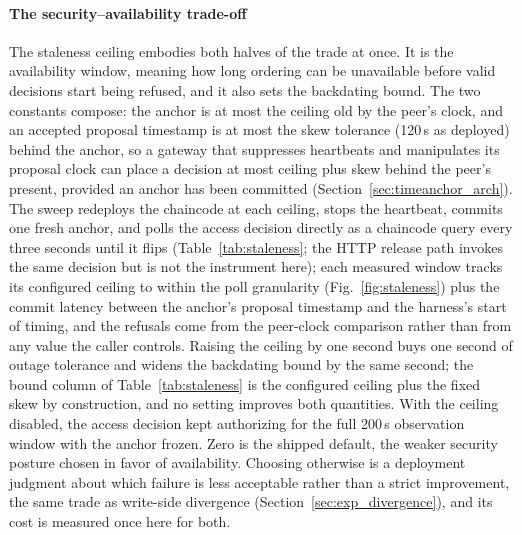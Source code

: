 \documentclass[preprint,12pt]{elsarticle}
\begin{document}
\paragraph{The security--availability trade-off}
The staleness ceiling embodies both halves of the trade at once. It is the
availability window, meaning how long ordering can be unavailable before valid
decisions start being refused, and it also sets the backdating bound. The two
constants compose: the anchor is at most the ceiling old by the peer's clock,
and an accepted proposal timestamp is at most the skew tolerance (120\,s as
deployed) behind the anchor, so a gateway that suppresses heartbeats and
manipulates its proposal clock can place a decision at most ceiling plus skew
behind the peer's present, provided an anchor has been committed
(Section~\ref{sec:timeanchor_arch}). The sweep redeploys the chaincode at each
ceiling,
stops the heartbeat, commits one fresh anchor, and polls the access decision
directly as a chaincode query every three seconds until it flips
(Table~\ref{tab:staleness}; the HTTP release path invokes the same decision
but is not the instrument here);
each measured window tracks its configured ceiling to within the poll
granularity (Fig.~\ref{fig:staleness}) plus the commit latency between the anchor's proposal timestamp
and the harness's start of timing, and the refusals come from the peer-clock
comparison rather than from any value the caller controls. Raising the ceiling by one second buys
one second of outage tolerance and widens the backdating bound by the same
second; the bound column of Table~\ref{tab:staleness} is the configured
ceiling plus the fixed skew by construction, and no setting improves both
quantities. With the ceiling
disabled, the access decision kept authorizing for the full 200\,s observation
window with the anchor frozen. Zero is the shipped default, the weaker
security posture chosen in favor of availability. Choosing otherwise is a
deployment judgment about which failure is less acceptable rather than a
strict improvement, the same trade as write-side divergence
(Section~\ref{sec:exp_divergence}), and its cost is measured once here for
both.
\end{document}
